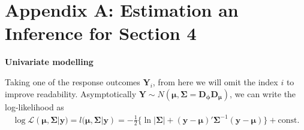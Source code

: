 \documentclass[useAMS,referee]{biom}
\begin{document}





\appendix


	 \renewcommand{\theequation}{A.\arabic{equation}}
	\setcounter{equation}{0}  %
	
\section*{Appendix A: Estimation an Inference for Section 4}

\textbf{Univariate modelling}

Taking one of the response outcomes $\mathbf {Y} _i $, from here we will omit the index $ i $ to improve readability. Asymptotically  $\boldsymbol{Y} \sim N({\boldsymbol{\mu}},\boldsymbol{\Sigma}= \mathbf{D_\phi}\mathbf{D_\mu})$, we can write the log-likelihood as
\begin{equation}\label{eq12}
\begin{array}{l}
\log \mathcal{L}(\boldsymbol{\mu},\boldsymbol{\Sigma}| \mathbf{y})= l(\boldsymbol{\mu},\boldsymbol{\Sigma}| \mathbf{y})= -\frac{1}{2}\{\ln |\boldsymbol{\Sigma}| +  (\mathbf{y}-\boldsymbol{\mu})'\boldsymbol{\Sigma}^{-1} (\mathbf{y}-\boldsymbol{\mu})\} + \mbox{const.}





\end{array}
\end{equation}
\end{document}
